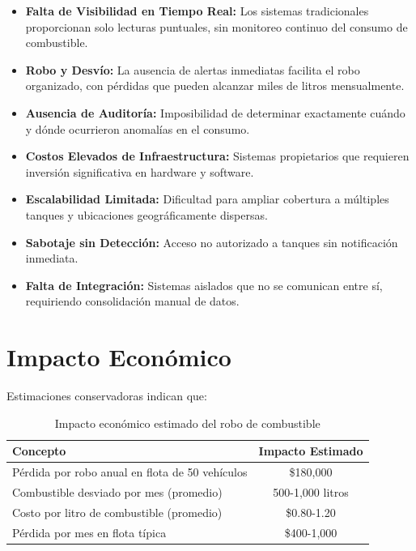 \documentclass[12pt,a4paper,oneside]{report}
\begin{document}
\begin{itemize}
    \item \textbf{Falta de Visibilidad en Tiempo Real:} Los sistemas tradicionales proporcionan solo lecturas puntuales, sin monitoreo continuo del consumo de combustible.
    
    \item \textbf{Robo y Desvío:} La ausencia de alertas inmediatas facilita el robo organizado, con pérdidas que pueden alcanzar miles de litros mensualmente.
    
    \item \textbf{Ausencia de Auditoría:} Imposibilidad de determinar exactamente cuándo y dónde ocurrieron anomalías en el consumo.
    
    \item \textbf{Costos Elevados de Infraestructura:} Sistemas propietarios que requieren inversión significativa en hardware y software.
    
    \item \textbf{Escalabilidad Limitada:} Dificultad para ampliar cobertura a múltiples tanques y ubicaciones geográficamente dispersas.
    
    \item \textbf{Sabotaje sin Detección:} Acceso no autorizado a tanques sin notificación inmediata.
    
    \item \textbf{Falta de Integración:} Sistemas aislados que no se comunican entre sí, requiriendo consolidación manual de datos.
\end{itemize}

\section{Impacto Económico}

Estimaciones conservadoras indican que:

\begin{table}[H]
    \centering
    \begin{tabular}{|l|c|}
        \hline
        \textbf{Concepto} & \textbf{Impacto Estimado} \\
        \hline
        Pérdida por robo anual en flota de 50 vehículos & \$180,000 \\
        Combustible desviado por mes (promedio) & 500-1,000 litros \\
        Costo por litro de combustible (promedio) & \$0.80-1.20 \\
        Pérdida por mes en flota típica & \$400-1,000 \\
        \hline
    \end{tabular}
    \caption{Impacto económico estimado del robo de combustible}
\end{table}
\end{document}
